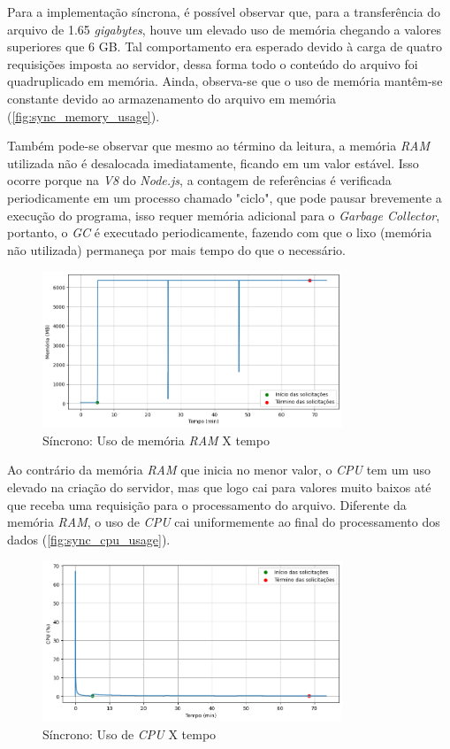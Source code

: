 \documentclass[12pt]{article}
\begin{document}
Para a implementação síncrona, é possível observar que, para a transferência do arquivo de 1.65 \textit{gigabytes}, 
houve um elevado uso de memória chegando a valores superiores que 6 GB. Tal comportamento era esperado
devido à carga de quatro requisições imposta ao servidor, dessa forma todo o conteúdo do arquivo foi quadruplicado em memória.
Ainda, observa-se que o uso de memória mantêm-se constante devido ao armazenamento do 
arquivo em memória (\autoref{fig:sync_memory_usage}).

Também pode-se observar que mesmo ao término da leitura,
a memória \textit{RAM} utilizada não é desalocada imediatamente, ficando em um valor estável.
Isso ocorre porque na \textit{V8} do \textit{Node.js}, a contagem de referências é verificada periodicamente em um
processo chamado "ciclo", que pode pausar brevemente a execução do programa, isso requer memória 
adicional para o \textit{Garbage Collector}, portanto, o \textit{GC} é executado periodicamente,
fazendo com que o lixo (memória não utilizada) permaneça por mais tempo do que o necessário. \cite[p. 35]{DIOGORESENDE}


\begin{figure}[H]
\centering
\includegraphics[width=0.8\textwidth]{images/pt-br/results/sync_memory_usage.png}
\caption{Síncrono: Uso de memória \textit{RAM} X tempo}\label{fig:sync_memory_usage}
\end{figure}


Ao contrário da memória \textit{RAM} que inicia no menor valor, 
o \textit{CPU} tem um uso elevado na criação do servidor, mas que logo
cai para valores muito baixos até que receba uma requisição para o processamento do arquivo. 
Diferente da memória \textit{RAM}, o uso de \textit{CPU} cai uniformemente ao final 
do processamento dos dados (\autoref{fig:sync_cpu_usage}).


\begin{figure}[H]
\centering
\includegraphics[width=0.8\textwidth]{images/pt-br/results/sync_cpu_usage.png}
\caption{Síncrono: Uso de \textit{CPU} X tempo}\label{fig:sync_cpu_usage}
\end{figure}
\end{document}
